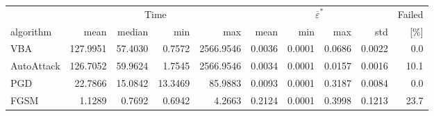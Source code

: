 \small
\setlength{\tabcolsep}{3pt}
\begin{tabular}{lrrrrrrrrr}
\toprule
 & \multicolumn{4}{c}{Time} & \multicolumn{4}{c}{$\overline{\varepsilon}^*$} & Failed \\
  \cmidrule(lr){2-5}\cmidrule(lr){6-9}
algorithm & mean & median & min & max & mean & min & max & std & [\%] \\
\midrule
VBA & 127.9951 & 57.4030 & 0.7572 & 2566.9546 & 0.0036 & 0.0001 & 0.0686 & 0.0022 & 0.0 \\
AutoAttack & 126.7052 & 59.9624 & 1.7545 & 2566.9546 & 0.0034 & 0.0001 & 0.0157 & 0.0016 & 10.1 \\
PGD & 22.7866 & 15.0842 & 13.3469 & 85.9883 & 0.0093 & 0.0001 & 0.3187 & 0.0084 & 0.0 \\
FGSM & 1.1289 & 0.7692 & 0.6942 & 4.2663 & 0.2124 & 0.0001 & 0.3998 & 0.1213 & 23.7 \\
\bottomrule
\end{tabular}
